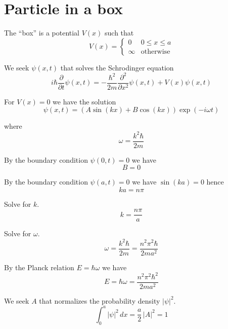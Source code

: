 

\section*{Particle in a box}

The ``box'' is a potential $V(x)$ such that
\begin{equation*}
V(x)=\begin{cases}
0 & 0\le x\le a
\\
\infty & \text{otherwise}
\end{cases}
\end{equation*}

We seek $\psi(x,t)$ that solves the Schrodinger equation
\begin{equation*}
i\hbar\frac{\partial}{\partial t}\psi(x,t)
=-\frac{\hbar^2}{2m}\frac{\partial^2}{\partial x^2}\psi(x,t)+V(x)\psi(x,t)
\end{equation*}

For $V(x)=0$ we have the solution
\begin{equation*}
\psi(x,t)=\left(A\sin(kx)+B\cos(kx)\right)\exp(-i\omega t)
\end{equation*}

where
\begin{equation*}
\omega=\frac{k^2\hbar}{2m}
\end{equation*}

By the boundary condition $\psi(0,t)=0$ we have
\begin{equation*}
B=0
\end{equation*}

By the boundary condition $\psi(a,t)=0$ we have $\sin(ka)=0$ hence
\begin{equation*}
ka=n\pi
\end{equation*}

Solve for $k$.
\begin{equation*}
k=\frac{n\pi}{a}
\end{equation*}

Solve for $\omega$.
\begin{equation*}
\omega=\frac{k^2\hbar}{2m}=\frac{n^2\pi^2\hbar}{2ma^2}
\end{equation*}

By the Planck relation $E=\hbar\omega$ we have
\begin{equation*}
E=\hbar\omega=\frac{n^2\pi^2\hbar^2}{2ma^2}
\end{equation*}

We seek $A$ that normalizes the probability density $|\psi|^2$.
\begin{equation*}
\int_0^a|\psi|^2\,dx=\frac{a}{2}\,|A|^2=1
\end{equation*}

